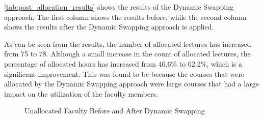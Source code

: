 \begin{table}[H]
  \centering
  \caption{Allocation Results Before and After Dynamic Swapping}
  \label{tab:post_allocation_results}
\end{table}

\autoref{tab:post_allocation_results} shows the results of the Dynamic Swapping approach. The first column shows the results before, while the second column shows the results after the Dynamic Swapping approach is applied.

As can be seen from the results, the number of allocated lectures has increased from 75 to 78. Although a small increase in the count of allocated lectures, the percentage of allocated hours has increased from 46.6\% to 62.2\%, which is a significant improvement. This was found to be because the courses that were allocated by the Dynamic Swapping approach were large courses that had a large impact on the utilization of the faculty members.

\begin{figure}[H]
  \centering
  \caption{Unallocated Faculty Before and After Dynamic Swapping}
  \label{fig:faculty_utilization_dynamic_swapping}
\end{figure}

